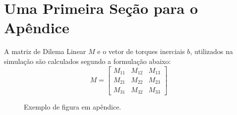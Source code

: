 \section{Uma Primeira Seção para o Apêndice}

A matriz de Dilema Linear $M$ e o vetor de torques inerciais $b$,
utilizados na simulação são calculados segundo a formulação 
abaixo:
\begin{equation}
M=\left[ \begin{array}{ccc}
M_{11} & M_{12} & M_{13} \\
M_{21} & M_{22} & M_{23} \\
M_{31} & M_{32} & M_{33}
\end{array} \right]
\end{equation}

\begin{figure}[h]
\centering
{}
\caption{Exemplo de figura em apêndice.}\label{FD}
\end{figure}
